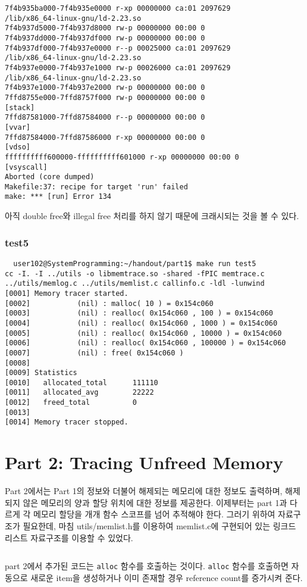 \documentclass{report}
\begin{document}
\begin{verbatim}
7f4b935ba000-7f4b935e0000 r-xp 00000000 ca:01 2097629                    /lib/x86_64-linux-gnu/ld-2.23.so
7f4b937d5000-7f4b937d8000 rw-p 00000000 00:00 0
7f4b937dd000-7f4b937df000 rw-p 00000000 00:00 0
7f4b937df000-7f4b937e0000 r--p 00025000 ca:01 2097629                    /lib/x86_64-linux-gnu/ld-2.23.so
7f4b937e0000-7f4b937e1000 rw-p 00026000 ca:01 2097629                    /lib/x86_64-linux-gnu/ld-2.23.so
7f4b937e1000-7f4b937e2000 rw-p 00000000 00:00 0
7ffd8755e000-7ffd8757f000 rw-p 00000000 00:00 0                          [stack]
7ffd87581000-7ffd87584000 r--p 00000000 00:00 0                          [vvar]
7ffd87584000-7ffd87586000 r-xp 00000000 00:00 0                          [vdso]
ffffffffff600000-ffffffffff601000 r-xp 00000000 00:00 0                  [vsyscall]
Aborted (core dumped)
Makefile:37: recipe for target 'run' failed
make: *** [run] Error 134
\end{verbatim}
아직 double free와 illegal free 처리를 하지 않기 때문에 크래시되는 것을 볼 수 있다. 

\subsubsection{test5}
\begin{verbatim}
  user102@SystemProgramming:~/handout/part1$ make run test5
cc -I. -I ../utils -o libmemtrace.so -shared -fPIC memtrace.c ../utils/memlog.c ../utils/memlist.c callinfo.c -ldl -lunwind
[0001] Memory tracer started.
[0002]           (nil) : malloc( 10 ) = 0x154c060
[0003]           (nil) : realloc( 0x154c060 , 100 ) = 0x154c060
[0004]           (nil) : realloc( 0x154c060 , 1000 ) = 0x154c060
[0005]           (nil) : realloc( 0x154c060 , 10000 ) = 0x154c060
[0006]           (nil) : realloc( 0x154c060 , 100000 ) = 0x154c060
[0007]           (nil) : free( 0x154c060 )
[0008]
[0009] Statistics
[0010]   allocated_total      111110
[0011]   allocated_avg        22222
[0012]   freed_total          0
[0013]
[0014] Memory tracer stopped.
\end{verbatim}

\section{Part 2: Tracing Unfreed Memory}
Part 2에서는 Part 1의 정보와 더불어 해제되는 메모리에 대한 정보도 출력하며, 해제되지 않은 메모리의 양과 할당 위치에 대한 정보를 제공한다. 이제부터는 part 1과 다르게 각 메모리 할당을 개개 함수 스코프를 넘어 추적해야 한다. 그러기 위하여 자료구조가 필요한데, 마침 utils/memlist.h를 이용하여 memlist.c에 구현되어 있는 링크드 리스트 자료구조를 이용할 수 있었다.
\inputminted[firstline=35,lastline=43, linenos]{C}{2019-13674.224747/part2/memtrace.c}
part 2에서 추가된 코드는 \lstinline{alloc} 함수를 호출하는 것이다. \lstinline{alloc} 함수를 호출하면 자동으로 새로운 item을 생성하거나 이미 존재할 경우 reference count를 증가시켜 준다.
\end{document}

